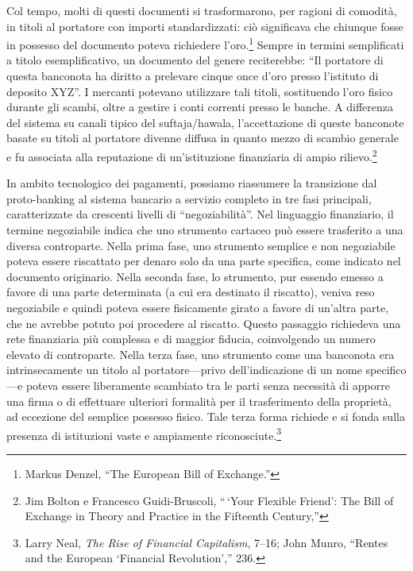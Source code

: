\documentclass[
  a5paper,
  smalldemyvopaper,10pt,twoside,onecolumn,openright,extrafontsizes,hidelinks]{memoir}
\begin{document}
Col tempo, molti di questi documenti si trasformarono, per ragioni di
comodità, in titoli al portatore con importi standardizzati: ciò
significava che chiunque fosse in possesso del documento poteva
richiedere l'oro.\footnote{Markus Denzel, ``The European Bill of
  Exchange.''} Sempre in termini semplificati a titolo esemplificativo,
un documento del genere reciterebbe: ``Il portatore di questa banconota
ha diritto a prelevare cinque once d'oro presso l'istituto di deposito
XYZ''. I mercanti potevano utilizzare tali titoli, sostituendo l'oro
fisico durante gli scambi, oltre a gestire i conti correnti presso le
banche. A differenza del sistema su canali tipico del suftaja/hawala,
l'accettazione di queste banconote basate su titoli al portatore divenne
diffusa in quanto mezzo di scambio generale e fu associata alla
reputazione di un'istituzione finanziaria di ampio rilievo.\footnote{Jim
  Bolton e Francesco Guidi-Bruscoli, ``\,`Your Flexible Friend': The
  Bill of Exchange in Theory and Practice in the Fifteenth Century,''}

In ambito tecnologico dei pagamenti, possiamo riassumere la transizione
dal proto-banking al sistema bancario a servizio completo in tre fasi
principali, caratterizzate da crescenti livelli di ``negoziabilità''.
Nel linguaggio finanziario, il termine negoziabile indica che uno
strumento cartaceo può essere trasferito a una diversa controparte.
Nella prima fase, uno strumento semplice e non negoziabile poteva essere
riscattato per denaro solo da una parte specifica, come indicato nel
documento originario. Nella seconda fase, lo strumento, pur essendo
emesso a favore di una parte determinata (a cui era destinato il
riscatto), veniva reso negoziabile e quindi poteva essere fisicamente
girato a favore di un'altra parte, che ne avrebbe potuto poi procedere
al riscatto. Questo passaggio richiedeva una rete finanziaria più
complessa e di maggior fiducia, coinvolgendo un numero elevato di
controparte. Nella terza fase, uno strumento come una banconota era
intrinsecamente un titolo al portatore---privo dell'indicazione di un
nome specifico---e poteva essere liberamente scambiato tra le parti
senza necessità di apporre una firma o di effettuare ulteriori formalità
per il trasferimento della proprietà, ad eccezione del semplice possesso
fisico. Tale terza forma richiede e si fonda sulla presenza di
istituzioni vaste e ampiamente riconosciute.\footnote{Larry Neal,
  \emph{The Rise of Financial Capitalism}, 7--16; John Munro, ``Rentes
  and the European `Financial Revolution','' 236.}
\end{document}

